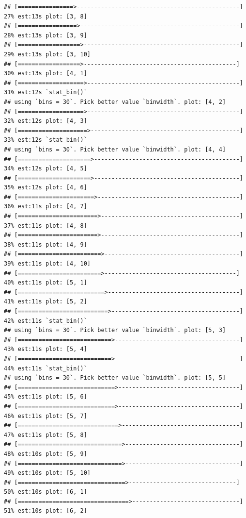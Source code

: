 \documentclass[
]{article}
\begin{document}
\begin{verbatim}
## [================>-----------------------------------------------] 27% est:13s plot: [3, 8]
## [=================>----------------------------------------------] 28% est:13s plot: [3, 9]
## [==================>---------------------------------------------] 29% est:13s plot: [3, 10]
## [==================>--------------------------------------------] 30% est:13s plot: [4, 1]
## [===================>--------------------------------------------] 31% est:12s `stat_bin()`
## using `bins = 30`. Pick better value `binwidth`. plot: [4, 2]
## [===================>--------------------------------------------] 32% est:12s plot: [4, 3]
## [====================>-------------------------------------------] 33% est:12s `stat_bin()`
## using `bins = 30`. Pick better value `binwidth`. plot: [4, 4]
## [=====================>------------------------------------------] 34% est:12s plot: [4, 5]
## [=====================>------------------------------------------] 35% est:12s plot: [4, 6]
## [======================>-----------------------------------------] 36% est:11s plot: [4, 7]
## [=======================>----------------------------------------] 37% est:11s plot: [4, 8]
## [=======================>----------------------------------------] 38% est:11s plot: [4, 9]
## [========================>---------------------------------------] 39% est:11s plot: [4, 10]
## [========================>--------------------------------------] 40% est:11s plot: [5, 1]
## [=========================>--------------------------------------] 41% est:11s plot: [5, 2]
## [==========================>-------------------------------------] 42% est:11s `stat_bin()`
## using `bins = 30`. Pick better value `binwidth`. plot: [5, 3]
## [===========================>------------------------------------] 43% est:11s plot: [5, 4]
## [===========================>------------------------------------] 44% est:11s `stat_bin()`
## using `bins = 30`. Pick better value `binwidth`. plot: [5, 5]
## [============================>-----------------------------------] 45% est:11s plot: [5, 6]
## [============================>-----------------------------------] 46% est:11s plot: [5, 7]
## [=============================>----------------------------------] 47% est:11s plot: [5, 8]
## [==============================>---------------------------------] 48% est:10s plot: [5, 9]
## [==============================>---------------------------------] 49% est:10s plot: [5, 10]
## [===============================>-------------------------------] 50% est:10s plot: [6, 1]
## [================================>-------------------------------] 51% est:10s plot: [6, 2]

\end{verbatim}
\end{document}
